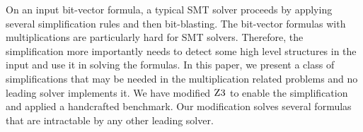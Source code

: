 %
On an input bit-vector formula,
a typical SMT solver proceeds by applying several
simplification rules and then bit-blasting.
%
The bit-vector formulas with multiplications
are particularly hard for SMT solvers.
%
Therefore, the simplification more importantly needs
to detect some high level structures
in the input and use it in solving the formulas.
%
In this paper, we present a class of simplifications
that may be needed in the multiplication related problems
and no leading solver implements it. 
%
We have modified $\textsc{Z3}$ to enable the simplification
and applied a handcrafted benchmark.
%
Our modification solves several formulas that are
intractable by any other leading solver.
%


